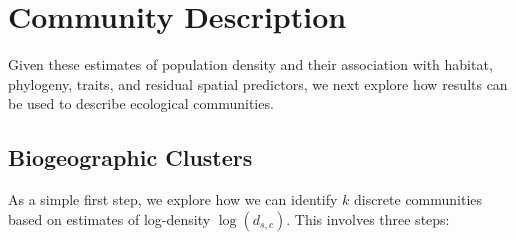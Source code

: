 \section{Community Description}

Given these estimates of population density and their association with habitat, phylogeny, traits, and residual spatial predictors, we next explore how results can be used to describe ecological communities.

\subsection{Biogeographic Clusters}

As a simple first step, we explore how we can identify \( k \) discrete communities based on estimates of log-density \( \log(d_{s,c}) \).  This involves three steps:

